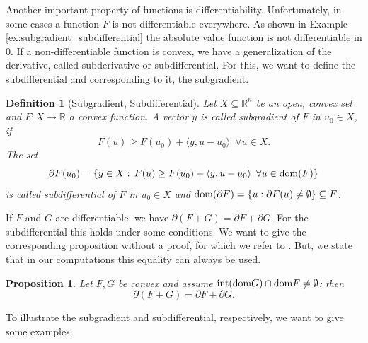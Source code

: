 \documentclass[abstracton]{scrreprt}
\newtheorem{proposition}[theorem]{Proposition}
\newtheorem{definition}[theorem]{Definition}
\begin{document}
        Another important property of functions is differentiability. Unfortunately, in some cases a function $F$ is not differentiable everywhere. As shown in Example \ref{ex:subgradient_subdifferential} the absolute value function is not differentiable in $0$. If a non-differentiable function is convex, we have a generalization of the derivative, called subderivative or subdifferential. For this, we want to define the subdifferential and corresponding to it, the subgradient.
        \begin{definition}[Subgradient, Subdifferential] %
        \label{def:subgradient_subdifferential}
            Let $X \subseteq \mathbb{R}^{n}$ be an open, convex set and $F: X \longrightarrow \mathbb{R}$ a convex function. A vector $y$ is called subgradient of $F$ in $u_{0} \in X$, if
                \begin{equation}
                    F(u) \ge F(u_{0}) + \langle y, u - u_{0} \rangle \,\,\, \forall u \in X.
                \label{eq:subgradient}
                \end{equation}
            The set
                $$
                    \partial F(u_{0}) = \{ y \in X: \, F(u) \ge F(u_{0}) + \langle y, u - u_{0} \rangle \,\,\, \forall u \in \textnormal{dom}(F) \}
                $$
            is called subdifferential of $F$ in $u_{0} \in X$ and $\textnormal{dom}(\partial F) = \{ u: \partial F(u) \ne \emptyset \} \subseteq F$.
        \end{definition}
        If $F$ and $G$ are differentiable, we have $\partial(F + G) = \partial F + \partial G$. For the subdifferential this holds under some conditions. We want to give the corresponding proposition without a proof, for which we refer to \cite{Rockafellar}. But, we state that in our computations this equality can always be used.
        \begin{proposition} %
            Let $F, G$ be convex and assume $\textnormal{int} (\textnormal{dom} G) \cap \textnormal{dom} F \ne \emptyset$: then
                $$
                    \partial(F + G) = \partial F + \partial G.
                $$
        \end{proposition}
        To illustrate the subgradient and subdifferential, respectively, we want to give some examples.
\end{document}
